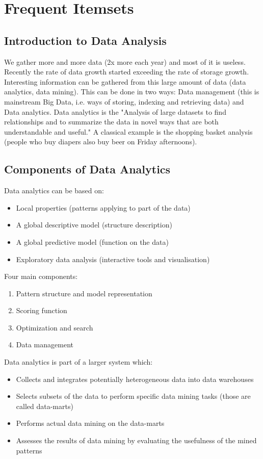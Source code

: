 \section{Frequent Itemsets}

\subsection{Introduction to Data Analysis}

We gather more and more data (2x more each year) and most of it is useless. Recently the rate of data growth started exceeding the rate of storage growth.
Interesting information can be gathered from this large amount of data (data analytics, data mining).
This can be done in two ways: Data management (this is mainstream Big Data, i.e. ways of storing, indexing and retrieving data) and Data analytics.
Data analytics is the "Analysis of large datasets to find relationships and to summarize the data in novel ways that are both understandable and useful." A classical example is the shopping basket analysis (people who buy diapers also buy beer on Friday afternoons).

\subsection{Components of Data Analytics}
Data analytics can be based on:
\begin{itemize}
\item Local properties (patterns applying to part of the data)
\item A global descriptive model (structure description)
\item A global predictive model (function on the data)
\item Exploratory data analysis (interactive tools and visualisation)
\end{itemize}

Four main components:
\begin{enumerate}
\item Pattern structure and model representation
\item Scoring function
\item Optimization and search
\item Data management
\end{enumerate}

Data analytics is part of a larger system which:
\begin{itemize}
\item Collects and integrates potentially heterogeneous data into data warehouses
\item Selects subsets of the data to perform specific data mining tasks (those are called data-marts)
\item Performs actual data mining on the data-marts
\item Assesses the results of data mining by evaluating the usefulness of the mined patterns
\end{itemize}

